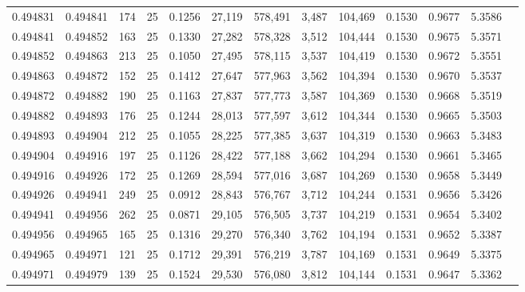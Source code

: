 \begin{tabular}{rrrrrrrrrrrrr}
0.494831 & 0.494841 & 174 &  25 &                                     0.1256 &  27,119 & 578,491 &   3,487 & 104,469 & 0.1530 & 0.9677 & 5.3586 \\
0.494841 & 0.494852 & 163 &  25 &                                     0.1330 &  27,282 & 578,328 &   3,512 & 104,444 & 0.1530 & 0.9675 & 5.3571 \\
0.494852 & 0.494863 & 213 &  25 &                                     0.1050 &  27,495 & 578,115 &   3,537 & 104,419 & 0.1530 & 0.9672 & 5.3551 \\
0.494863 & 0.494872 & 152 &  25 &                                     0.1412 &  27,647 & 577,963 &   3,562 & 104,394 & 0.1530 & 0.9670 & 5.3537 \\
0.494872 & 0.494882 & 190 &  25 &                                     0.1163 &  27,837 & 577,773 &   3,587 & 104,369 & 0.1530 & 0.9668 & 5.3519 \\
0.494882 & 0.494893 & 176 &  25 &                                     0.1244 &  28,013 & 577,597 &   3,612 & 104,344 & 0.1530 & 0.9665 & 5.3503 \\
0.494893 & 0.494904 & 212 &  25 &                                     0.1055 &  28,225 & 577,385 &   3,637 & 104,319 & 0.1530 & 0.9663 & 5.3483 \\
0.494904 & 0.494916 & 197 &  25 &                                     0.1126 &  28,422 & 577,188 &   3,662 & 104,294 & 0.1530 & 0.9661 & 5.3465 \\
0.494916 & 0.494926 & 172 &  25 &                                     0.1269 &  28,594 & 577,016 &   3,687 & 104,269 & 0.1530 & 0.9658 & 5.3449 \\
0.494926 & 0.494941 & 249 &  25 &                                     0.0912 &  28,843 & 576,767 &   3,712 & 104,244 & 0.1531 & 0.9656 & 5.3426 \\
0.494941 & 0.494956 & 262 &  25 &                                     0.0871 &  29,105 & 576,505 &   3,737 & 104,219 & 0.1531 & 0.9654 & 5.3402 \\
0.494956 & 0.494965 & 165 &  25 &                                     0.1316 &  29,270 & 576,340 &   3,762 & 104,194 & 0.1531 & 0.9652 & 5.3387 \\
0.494965 & 0.494971 & 121 &  25 &                                     0.1712 &  29,391 & 576,219 &   3,787 & 104,169 & 0.1531 & 0.9649 & 5.3375 \\
0.494971 & 0.494979 & 139 &  25 &                                     0.1524 &  29,530 & 576,080 &   3,812 & 104,144 & 0.1531 & 0.9647 & 5.3362 \\

\end{tabular}
